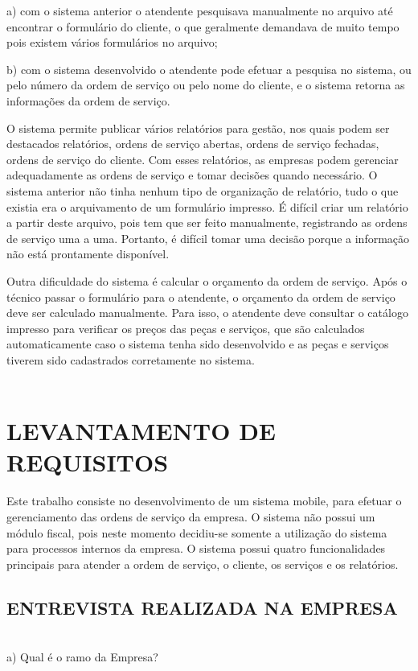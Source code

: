 a) com o sistema anterior o atendente pesquisava manualmente no arquivo até encontrar o formulário do cliente, o que geralmente demandava de muito tempo pois existem vários formulários no arquivo;

b) com o sistema desenvolvido o atendente pode efetuar a pesquisa no sistema, ou pelo número da ordem de serviço ou pelo nome do cliente, e o sistema retorna as informações da ordem de serviço. 

O sistema permite publicar vários relatórios para gestão, nos quais podem ser destacados relatórios, ordens de serviço abertas, ordens de serviço fechadas, ordens de serviço do cliente. Com esses relatórios, as empresas podem gerenciar adequadamente as ordens de serviço e tomar decisões quando necessário. O sistema anterior não tinha nenhum tipo de organização de relatório, tudo o que existia era o arquivamento de um formulário impresso. É difícil criar um relatório a partir deste arquivo, pois tem que ser feito manualmente, registrando as ordens de serviço uma a uma. Portanto, é difícil tomar uma decisão porque a informação não está prontamente disponível.

Outra dificuldade do sistema é calcular o orçamento da ordem de serviço. Após o técnico passar o formulário para o atendente, o orçamento da ordem de serviço deve ser calculado manualmente. Para isso, o atendente deve consultar o catálogo impresso para verificar os preços das peças e serviços, que são calculados automaticamente caso o sistema tenha sido desenvolvido e as peças e serviços tiverem sido cadastrados corretamente no sistema.
\\
\\

\section{LEVANTAMENTO DE REQUISITOS}
Este trabalho consiste no desenvolvimento de um sistema mobile, para efetuar o gerenciamento das ordens de serviço da empresa. O sistema não
possui um módulo fiscal, pois neste momento decidiu-se somente a utilização do sistema para
processos internos da empresa.  O sistema possui quatro funcionalidades principais para atender
a ordem de serviço, o cliente, os serviços e os relatórios.
\subsection{ENTREVISTA REALIZADA NA EMPRESA}
\\
a) Qual é o ramo da Empresa?

